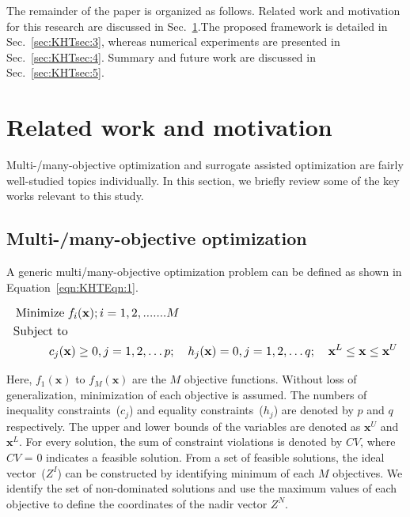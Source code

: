 \documentclass[twocolumn,10pt]{asme2ej}
\begin{document}
The remainder of the paper is organized as follows. Related work and motivation for this research are discussed in Sec.~\ref{sec:KHTsec:2}.The proposed framework is detailed in Sec.~\ref{sec:KHTsec:3}, whereas numerical experiments are presented in Sec.~\ref{sec:KHTsec:4}. Summary and future work are discussed in Sec.~\ref{sec:KHTsec:5}.

\vspace{-1em}
\section{Related work and motivation}
\label{sec:KHTsec:2}

Multi-/many-objective optimization and surrogate assisted optimization are fairly well-studied topics individually. In this section, we briefly review some of the key works relevant to this study. 
\vspace{-1em}
\subsection{Multi-/many-objective optimization}

A generic multi/many-objective optimization problem can be defined as shown in Equation~\ref{eqn:KHTEqn:1}.

\begin{equation}\footnotesize
\begin{aligned}
\operatorname{Minimize}\; & f_i(\textbf{x}); i=1,2,.......M \\
\text{Subject to} & \\
& \hspace{-0.6cm}c_j(\textbf{x})\ge 0, j=1,2,\ldots p ; \quad h_j(\textbf{x}) = 0, j=1,2,\ldots q;  \quad \textbf{x}^{L}\le\textbf{x}\le\textbf{x}^{U}\\ 
\label{eqn:KHTEqn:1}
\end{aligned}
\end{equation}

\noindent Here, $f_1(\textbf{x})$  to $f_M(\textbf{x})$ are the $M$ objective functions. Without loss of generalization, minimization of each objective is assumed. The numbers of inequality constraints~($c_j$) and equality constraints~($h_j$) are denoted by $p$ and $q$ respectively. The upper and lower bounds of the variables are denoted as $\textbf{x}^{U}$ and $\textbf{x}^{L}$. For every solution, the sum of constraint violations is denoted by $CV$, where $CV$ = $0$ indicates a feasible solution. From a set of feasible solutions, the ideal vector~($Z^I$) can be constructed by identifying minimum of each $M$ objectives. We identify the set of non-dominated solutions and use the maximum values of each objective to define the coordinates of the nadir vector $Z^N$.
\end{document}
